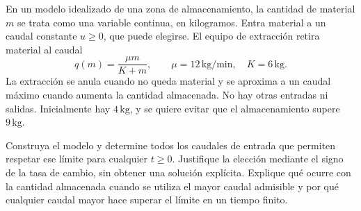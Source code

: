 En un modelo idealizado de una zona de almacenamiento, la cantidad de material \(m\) se trata como una variable continua, en kilogramos. Entra material a un caudal constante \(u\ge0\), que puede elegirse. El equipo de extracción retira material al caudal
\[
q(m)=\frac{\mu m}{K+m},\qquad
\mu=12\,\mathrm{kg/min},\quad K=6\,\mathrm{kg}.
\]
La extracción se anula cuando no queda material y se aproxima a un caudal máximo cuando aumenta la cantidad almacenada. No hay otras entradas ni salidas. Inicialmente hay \(4\,\mathrm{kg}\), y se quiere evitar que el almacenamiento supere \(9\,\mathrm{kg}\).

Construya el modelo y determine todos los caudales de entrada que permiten respetar ese límite para cualquier \(t\ge0\). Justifique la elección mediante el signo de la tasa de cambio, sin obtener una solución explícita. Explique qué ocurre con la cantidad almacenada cuando se utiliza el mayor caudal admisible y por qué cualquier caudal mayor hace superar el límite en un tiempo finito.
